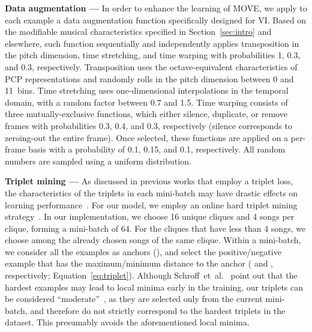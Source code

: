 \documentclass[letterpaper]{article}
\newcommand{\modelname}{MOVE}
\begin{document}
\noindent
\textbf{Data augmentation ---} In order to enhance the learning of \modelname, we apply to each example a data augmentation function specifically designed for VI. Based on the modifiable musical characteristics specified in Section~\ref{sec:intro} and elsewhere, such function sequentially and independently applies transposition in the pitch dimension, time stretching, and time warping with probabilities 1, 0.3, and 0.3, respectively. Transposition uses the octave-equivalent characteristics of PCP representations and randomly rolls  in the pitch dimension between 0 and 11~bins. Time stretching uses one-dimensional interpolations in the temporal domain, with a random factor between 0.7 and 1.5. Time warping consists of three mutually-exclusive functions, which either silence, duplicate, or remove frames with probabilities 0.3, 0.4, and 0.3, respectively (silence corresponds to zeroing-out the entire frame). Once selected, these functions are applied on a per-frame basis with a probability of 0.1, 0.15, and 0.1, respectively. All random numbers are sampled using a uniform distribution. 

\noindent
\textbf{Triplet mining ---} As discussed in previous works that employ a triplet loss, the characteristics of the triplets in each mini-batch may have drastic effects on learning performance~\cite{schroff2015, hermans2017}. For our model, we employ an online hard triplet mining strategy~\cite{hermans2017}. In our implementation, we choose 16 unique cliques and 4 songs per clique, forming a mini-batch of 64. For the cliques that have less than 4 songs, we choose among the already chosen songs of the same clique. Within a mini-batch, we consider all the examples as anchors (), and select the positive/negative example that has the maximum/minimum distance to the anchor ( and , respectively; Equation~\ref{eq:triplet}). Although Schroff~et~al.~\cite{schroff2015} point out that the hardest examples may lead to local minima early in the training, our triplets can be considered ``moderate''~\cite{hermans2017}, as they are selected only from the current mini-batch, and therefore do not strictly correspond to the hardest triplets in the dataset. This presumably avoids the aforementioned local minima.
\end{document}
